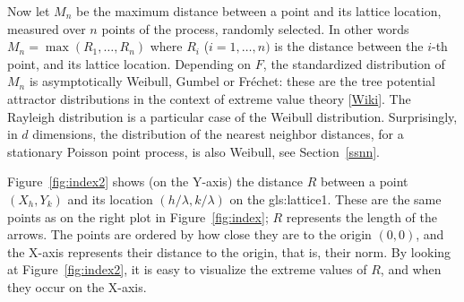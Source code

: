\documentclass[10pt]{article}
\begin{document}

\noindent Now let $M_n$ be
the maximum distance between a point and its lattice location, measured over $n$ points of the process, randomly selected. In other words
$M_n=\max(R_1,\dots,R_n)$ where $R_i$ ($i=1,\dots,n)$ is the distance between the $i$-th point, and its lattice location.   Depending on $F$, the standardized distribution of $M_n$ is asymptotically \textcolor{index}{Weibull}, Gumbel or Fréchet: these are the tree potential \textcolor{index}{attractor distributions} in the context of extreme value
theory [\href{https://en.wikipedia.org/wiki/Extreme_value_theory}{Wiki}].  The Rayleigh distribution is a particular case of the Weibull distribution. Surprisingly, in $d$ dimensions, the
distribution of the \textcolor{index}{nearest neighbor distances}, for a stationary Poisson point process, is also Weibull, see Section~\ref{ssnn}.

Figure~\ref{fig:index2} shows (on the Y-axis) the distance $R$ between a
point $(X_h,Y_k)$ and its  location $(h/\lambda,k/\lambda)$ on the \gls{gls:lattice1}. These are the same points as on the
right plot in Figure~\ref{fig:index}; $R$ represents the length of the arrows. The points are ordered by how close they are to the origin $(0,0)$, and the X-axis represents their distance to the origin, that is, their norm. By looking at Figure~\ref{fig:index2}, it is easy to visualize the extreme values of $R$, and when they occur on the X-axis. \\

\end{document}
